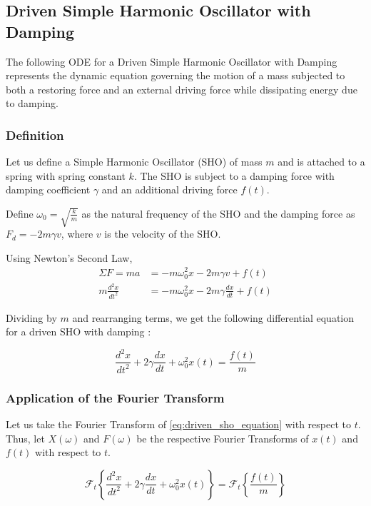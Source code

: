 \subsection{Driven Simple Harmonic Oscillator with Damping}
The following ODE for a Driven Simple Harmonic Oscillator with Damping represents the dynamic equation governing the motion of a mass subjected to both a restoring force and an external driving force while dissipating energy due to damping.

\subsubsection{Definition}
Let us define a Simple Harmonic Oscillator (SHO) of mass \(m\) and is attached to a spring with spring constant \(k\).
The SHO is subject to a damping force with damping coefficient \(\gamma\) and an additional driving force \(f(t)\).

\vspace{5mm}

Define \(\omega_0 = \sqrt{\frac{k}{m}}\) as the natural frequency of the SHO and the damping force as \(F_d = -2 m \gamma v\), where \(v\) is the velocity of the SHO.

\noindent
Using Newton's Second Law,
\begin{align}
    \Sigma F = ma &= -m \omega_0^2 x - 2 m \gamma v + f(t) \\
    m \frac{d^2 x}{dt^2} &= -m \omega_0^2 x - 2 m \gamma \frac{dx}{dt} + f(t)
\end{align}

\noindent
Dividing by \(m\) and rearranging terms, we get the following differential equation for a driven SHO with damping \citep{Libretexts_2021a}:

\begin{equation} \label{eq:driven_sho_equation}
    \frac{d^2 x}{dt^2} + 2 \gamma \frac{dx}{dt} + \omega_0^2 x(t) = \frac{f(t)}{m}
\end{equation}

\subsubsection{Application of the Fourier Transform}
\noindent
Let us take the Fourier Transform of \cref{eq:driven_sho_equation} with respect to \(t\). Thus, let \(X(\omega)\) and \(F(\omega)\) be the respective Fourier Transforms of \(x(t)\) and \(f(t)\) with respect to \(t\).

\begin{equation}
    \mathcal{F}_t \left\{ \frac{d^2 x}{dt^2} + 2 \gamma \frac{dx}{dt} + \omega_0^2 x(t) \right\} = \mathcal{F}_t \left\{ \frac{f(t)}{m} \right\}
\end{equation}

